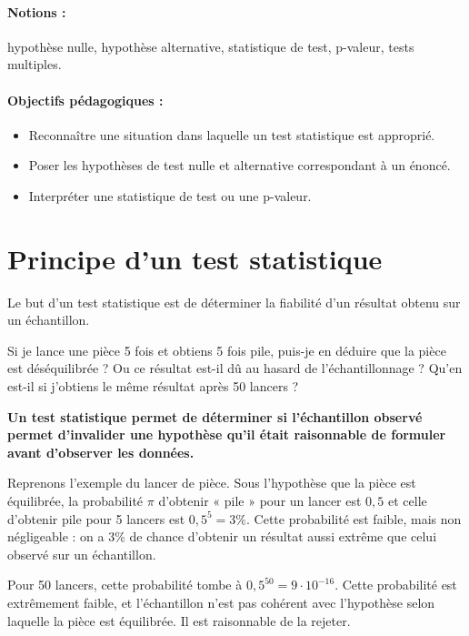 \label{chap:tests}

\paragraph{Notions :} hypothèse nulle, hypothèse alternative, statistique de
test, p-valeur, tests multiples.
\paragraph{Objectifs pédagogiques :} 
\begin{itemize}      
  \setlength{\itemsep}{3pt}
\item Reconnaître une situation dans laquelle un test statistique est
  approprié.
\item Poser les hypothèses de test nulle et alternative correspondant à un
  énoncé.
\item Interpréter une statistique de test ou une p-valeur.
\end{itemize}


\section{Principe d'un test statistique}
\label{sec:principe_test}
Le but d'un test statistique est de déterminer la fiabilité d'un résultat
obtenu sur un échantillon.

\begin{exemple}
Si je lance une pièce 5 fois et obtiens 5 fois pile, puis-je en déduire que
  la pièce est déséquilibrée ? Ou ce résultat est-il dû au hasard de
  l'échantillonnage ? Qu'en est-il si j'obtiens le même résultat après 50
  lancers ? 
\end{exemple}

\textbf{Un test statistique permet de déterminer si l'échantillon observé
  permet d'invalider une hypothèse qu'il était raisonnable de formuler avant
  d'observer les données.}

\begin{exemple}
  Reprenons l'exemple du lancer de pièce. Sous l'hypothèse que la pièce est
  équilibrée, la probabilité $\pi$ d'obtenir « pile » pour un lancer est $0,5$
  et celle d'obtenir pile pour 5 lancers est $0,5^5 = 3\%.$ Cette probabilité
  est faible, mais non négligeable : on a 3\% de chance d'obtenir un résultat
  aussi extrême que celui observé sur un échantillon.

  Pour 50 lancers, cette probabilité tombe à $0,5^{50} = 9 \cdot 10^{-16}.$
  Cette probabilité est extrêmement faible, et l'échantillon n'est pas cohérent
  avec l'hypothèse selon laquelle la pièce est équilibrée. Il est raisonnable
  de la rejeter.
\end{exemple}

